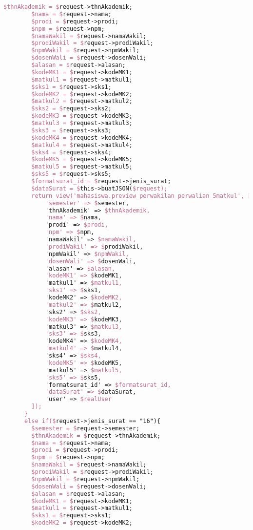 \begin{lstlisting}[language=tex,basicstyle=\tiny,caption=PesanansuratController.php]
        $thnAkademik = $request->thnAkademik;
        $nama = $request->nama;
        $prodi = $request->prodi;
        $npm = $request->npm;
        $namaWakil = $request->namaWakil;
        $prodiWakil = $request->prodiWakil;
        $npmWakil = $request->npmWakil;
        $dosenWali = $request->dosenWali;
        $alasan = $request->alasan;
        $kodeMK1 = $request->kodeMK1;
        $matkul1 = $request->matkul1;
        $sks1 = $request->sks1;
        $kodeMK2 = $request->kodeMK2;
        $matkul2 = $request->matkul2;
        $sks2 = $request->sks2;
        $kodeMK3 = $request->kodeMK3;
        $matkul3 = $request->matkul3;
        $sks3 = $request->sks3;
        $kodeMK4 = $request->kodeMK4;
        $matkul4 = $request->matkul4;
        $sks4 = $request->sks4;
        $kodeMK5 = $request->kodeMK5;
        $matkul5 = $request->matkul5;
        $sks5 = $request->sks5;
        $formatsurat_id = $request->jenis_surat;
        $dataSurat = $this->buatJSON($request);
        return view('mahasiswa.preview_perwakilan_perwalian_5matkul', [
            'semester' => $semester,
            'thnAkademik' => $thnAkademik,
            'nama' => $nama,
            'prodi' => $prodi,
            'npm' => $npm,
            'namaWakil' => $namaWakil,
            'prodiWakil' => $prodiWakil,
            'npmWakil' => $npmWakil,
            'dosenWali' => $dosenWali,
            'alasan' => $alasan,
            'kodeMK1' => $kodeMK1,
            'matkul1' => $matkul1,
            'sks1' => $sks1,
            'kodeMK2' => $kodeMK2,
            'matkul2' => $matkul2,
            'sks2' => $sks2,
            'kodeMK3' => $kodeMK3,
            'matkul3' => $matkul3,
            'sks3' => $sks3,
            'kodeMK4' => $kodeMK4,
            'matkul4' => $matkul4,
            'sks4' => $sks4,
            'kodeMK5' => $kodeMK5,
            'matkul5' => $matkul5,
            'sks5' => $sks5,
            'formatsurat_id' => $formatsurat_id,
            'dataSurat' => $dataSurat,
            'user' => $realUser
        ]);
      }
      else if($request->jenis_surat == "16"){
        $semester = $request->semester;
        $thnAkademik = $request->thnAkademik;
        $nama = $request->nama;
        $prodi = $request->prodi;
        $npm = $request->npm;
        $namaWakil = $request->namaWakil;
        $prodiWakil = $request->prodiWakil;
        $npmWakil = $request->npmWakil;
        $dosenWali = $request->dosenWali;
        $alasan = $request->alasan;
        $kodeMK1 = $request->kodeMK1;
        $matkul1 = $request->matkul1;
        $sks1 = $request->sks1;
        $kodeMK2 = $request->kodeMK2;

\end{lstlisting}
